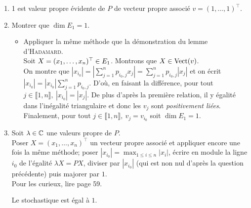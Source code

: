 \begin{solution}
    \begin{enumerate}
        \item 1 est valeur propre évidente de $P$ de vecteur propre associé $v = (1, \dots, 1)^\top$.
        \item Montrer que $\dim E_1 = 1$.
        \begin{itemize}
            \item Appliquer la même méthode que la démonstration du lemme d'\textsc{Hadamard}. \\
            Soit $X = (x_1, \dots, x_n)^\top \in E_1$. Montrons que $X \in \mathrm{Vect}(v)$. \\
            On montre que $|x_{i_0}| = \left| \sum\limits_{j=1}^{n} p_{i_0, j} x_j \right| = \sum\limits_{j=1}^{n} p_{i_0, j} |x_j|$ et on écrit $|x_{i_0}| = |x_{i_0}| \sum\limits_{j=1}^{n} p_{i_0, j}$. D'où, en faisant la différence, pour tout $j \in \llbracket 1, n \rrbracket,\ |x_{i_0}| = |x_j|$. De plus d'après la première relation, il y égalité dans l'inégalité triangulaire et donc les $v_j$ sont \emph{positivement liées}. Finalement, pour tout $j \in \llbracket1, n \rrbracket,\ v_j = v_{i_0}$ soit $\dim E_1 = 1$.
        \end{itemize}
        \item Soit $\lambda \in \mathbb{C}$ une valeurs propre de $P$. \\
        Poser $X = (x_1, \dots, x_n)^\top$ un vecteur propre associé et appliquer encore une fois la même méthode; poser $\displaystyle |x_{i_0}|= \max_{1 \leqslant i \leqslant n} |x_i|$, écrire en module la ligne $i_0$ de l'égalité $\lambda X = P X$, diviser par $|x_{i_0}|$ (qui est non nul d'après la question précédente) puis majorer par $1$. \\
            
        Pour les curieux, lire \cite{matrices} page 59. 
        
        \begin{prop}{}
            Le  stochastique est égal à $1$.
        \end{prop}
    

\end{enumerate}
\end{solution}
